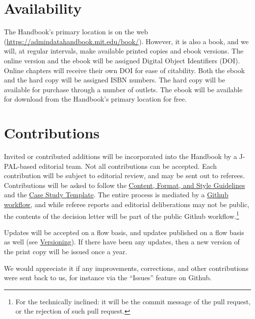 \documentclass[
]{book}
\begin{document}
\hypertarget{availability}{%
\section*{Availability}\label{availability}}

The Handbook's primary location is on the web (\url{https://admindatahandbook.mit.edu/book/}). However, it is also a book, and we will, at regular intervals, make available printed copies and ebook versions. The online version and the ebook will be assigned Digital Object Identifiers (DOI). Online chapters will receive their own DOI for ease of citability. Both the ebook and the hard copy will be assigned ISBN numbers. The hard copy will be available for purchase through a number of outlets. The ebook will be available for download from the Handbook's primary location for free.

\hypertarget{contributions}{%
\section*{Contributions}\label{contributions}}

Invited or contributed additions will be incorporated into the Handbook by a J-PAL-based editorial team. Not all contributions can be accepted. Each contribution will be subject to editorial review, and may be sent out to referees. Contributions will be asked to follow the \protect\hyperlink{content-format-and-style-guidelines}{Content, Format, and Style Guidelines} and the \protect\hyperlink{case-study-template}{Case Study Template}. The entire process is mediated by a \href{https://guides.github.com/introduction/flow/}{Github workflow}, and while referee reports and editorial deliberations may not be public, the contents of the decision letter will be part of the public Github workflow.\footnote{For the technically inclined: it will be the commit message of the pull request, or the rejection of such pull request.}

Updates will be accepted on a flow basis, and updates published on a flow basis as well (see \protect\hyperlink{versioning}{Versioning}). If there have been any updates, then a new version of the print copy will be issued once a year.

We would appreciate it if any improvements, corrections, and other contributions were sent back to us, for instance via the ``Issues'' feature on Github.
\end{document}
